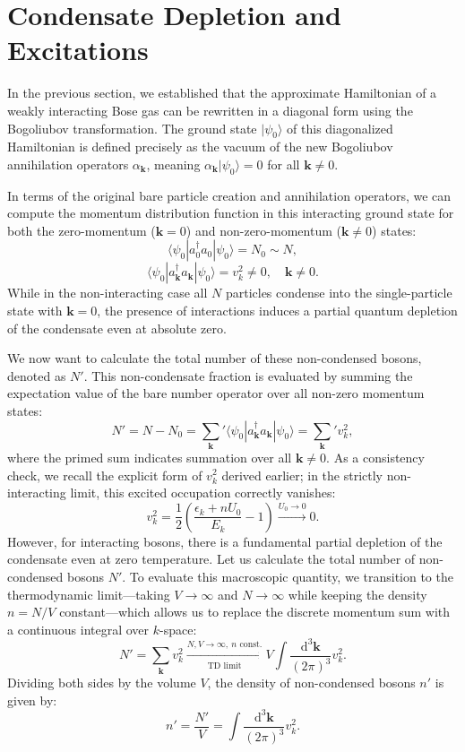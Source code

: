 \section{Condensate Depletion and Excitations}

In the previous section, we established that the approximate Hamiltonian of a weakly interacting Bose gas can be rewritten in a diagonal form using the Bogoliubov transformation. The ground state \( |\psi_0\rangle \) of this diagonalized Hamiltonian is defined precisely as the vacuum of the new Bogoliubov annihilation operators \( \alpha_{\mathbf{k}} \), meaning \( \alpha_{\mathbf{k}} |\psi_0\rangle = 0 \) for all \( \mathbf{k} \neq 0 \).

In terms of the original bare particle creation and annihilation operators, we can compute the momentum distribution function in this interacting ground state for both the zero-momentum (\( \mathbf{k} = 0 \)) and non-zero-momentum (\( \mathbf{k} \neq 0 \)) states:
\[
    \langle \psi_0 | a_0^\dagger a_0 | \psi_0 \rangle = N_0 \sim N,
\]
\[
    \langle \psi_0 | a_{\mathbf{k}}^\dagger a_{\mathbf{k}} | \psi_0 \rangle = v_k^2 \neq 0, \quad \mathbf{k} \neq 0.
\]
While in the non-interacting case all \( N \) particles condense into the single-particle state with \( \mathbf{k} = 0 \), the presence of interactions induces a partial quantum depletion of the condensate even at absolute zero.

We now want to calculate the total number of these non-condensed bosons, denoted as \( N' \). This non-condensate fraction is evaluated by summing the expectation value of the bare number operator over all non-zero momentum states:
\[
    N' = N - N_0 = \sum_{\mathbf{k}}' \langle \psi_0 | a_{\mathbf{k}}^\dagger a_{\mathbf{k}} | \psi_0 \rangle = \sum_{\mathbf{k}}' v_k^2,
\]
where the primed sum indicates summation over all \( \mathbf{k} \neq 0 \). As a consistency check, we recall the explicit form of \( v_k^2 \) derived earlier; in the strictly non-interacting limit, this excited occupation correctly vanishes:
\[
    v_k^2 = \frac{1}{2}\left(\frac{\epsilon_k + nU_0}{E_k} - 1\right) \xrightarrow{U_0 \to 0} 0.
\]
However, for interacting bosons, there is a fundamental partial depletion of the condensate even at zero temperature. Let us calculate the total number of non-condensed bosons $N'$. To evaluate this macroscopic quantity, we transition to the thermodynamic limit—taking $V \to \infty$ and $N \to \infty$ while keeping the density $n = N/V$ constant—which allows us to replace the discrete momentum sum with a continuous integral over $k$-space:
\[
    N' = \sum_{\mathbf{k}} v_k^2 \xrightarrow[\text{TD limit}]{N, V \to \infty, \ n \text{ const.}} V \int \frac{\mathrm{d}^3\mathbf{k}}{(2\pi)^3} v_k^2.
\]
Dividing both sides by the volume $V$, the density of non-condensed bosons $n'$ is given by:
\begin{equation} \label{eq:depletion_density_integral}
    n' = \frac{N'}{V} = \int \frac{\mathrm{d}^3\mathbf{k}}{(2\pi)^3} v_k^2.
\end{equation}

